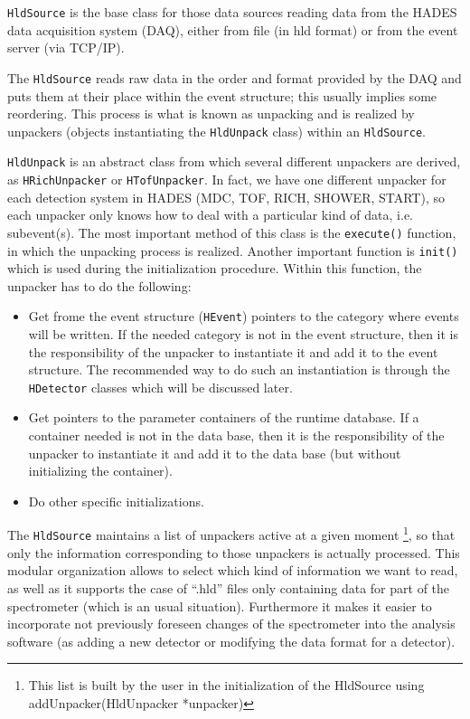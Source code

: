 \verb+HldSource+ is the base class for those data sources reading data from the 
HADES data acquisition system (DAQ), either from file (in hld format) or from the 
event server (via TCP/IP). 

The \verb+HldSource+ reads raw data in the order and format provided by the DAQ and 
puts them at their place within the event structure; this usually implies some reordering. 
This process is what is known as unpacking and is realized by unpackers (objects 
instantiating the \verb+HldUnpack+ class) within an \verb+HldSource+.

\verb+HldUnpack+ is an abstract class from which several different unpackers are derived, 
as \newline
\verb+HRichUnpacker+ or \verb+HTofUnpacker+. In fact, we have one different unpacker for 
each detection system in HADES (MDC, TOF, RICH, SHOWER, START), so each unpacker only knows 
how to deal with a particular kind of data, i.e. subevent(s). The most important method of 
this class is the \verb+execute()+ function, in which the unpacking process is realized. 
Another important function is \verb+init()+ which is used during the initialization 
procedure. Within this function, the unpacker has to do the following:

\begin{itemize}
    \item Get frome the event structure (\verb+HEvent+) pointers to the category where 
    events will be written. If the needed category is not in the event structure, then 
    it is the responsibility of the unpacker to instantiate it and add it to the event 
    structure. The recommended way to do such an instantiation is through the \verb+HDetector+ 
    classes which will be discussed later.

    \item Get pointers to the parameter containers of the runtime database. If a container 
    needed is not in the data base, then it is the responsibility of the unpacker to 
    instantiate it and add it to the data base (but without initializing the container).

    \item Do other specific initializations. 
\end{itemize}

The \verb+HldSource+ maintains a list of unpackers active at a given moment 
\footnote{This list is built by the user in the initialization of the HldSource using 
addUnpacker(HldUnpacker *unpacker)}, so that only the information corresponding to those 
unpackers is actually processed. This modular organization allows to select which kind 
of information we want to read, as well as it supports the case of ``.hld'' files only 
containing data for part of the spectrometer (which is an usual situation). Furthermore 
it makes it easier to incorporate not previously foreseen changes of the spectrometer 
into the analysis software (as adding a new detector or modifying the data format for 
a detector).

